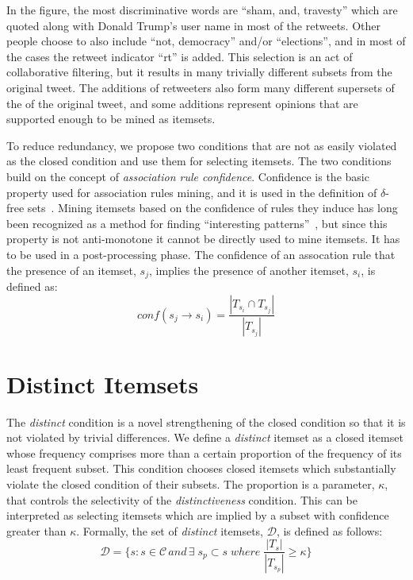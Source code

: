 \documentclass[letterpaper,12pt,titlepage,oneside,final]{book}
\begin{document}
In the figure, the most discriminative words are ``sham, and, travesty''
which are quoted along with Donald Trump's user name in most of the retweets.
Other people choose to also include ``not, democracy'' and/or ``elections'',
and in most of the cases the retweet indicator ``rt'' is added. 
This selection is an act of collaborative filtering,
but it results in many trivially different subsets from the original tweet.
The additions of retweeters also form many different supersets of the of the
original tweet, and some additions represent opinions that are supported
enough to be mined as itemsets. 

To reduce redundancy, we propose two conditions that are not as easily violated 
as the closed condition and use them for selecting itemsets.
The two conditions build on the concept of \emph{association rule confidence}.
Confidence is the basic property used for association rules mining,
and it is used in the definition of $\delta$-free sets~\cite{boulicaut2003free}.
Mining itemsets based on the confidence of rules they induce has long been
recognized as a method for finding
``interesting patterns''~\cite{cohen2001finding},
but since this property is not anti-monotone it cannot be directly used
to mine itemsets. It has to be used in a post-processing phase.
The confidence of an assocation rule that the presence of an itemset,
$s_{j}$, implies the presence of another itemset, $s_i$, is  defined as:
\begin{equation}\label{eq:conf}conf(s_j \rightarrow s_i) = \frac{|T_{s_i} \cap T_{s_j}|}{|T_{s_j}|}\end{equation}


\section{Distinct Itemsets}


The \emph{distinct} condition is a novel strengthening of the closed condition
so that it is not violated by trivial differences.
We define a \emph{distinct} itemset as a closed itemset whose frequency
comprises more than a certain proportion of the frequency of its least
frequent subset. 
This condition chooses closed itemsets which substantially violate the closed
condition of their subsets.
The proportion is a parameter, $\kappa$, that controls the selectivity of the
\emph{distinctiveness} condition.
This can be interpreted as selecting itemsets which are implied by a subset
with confidence greater than $\kappa$.
Formally, the set of \emph{distinct} itemsets, $\mathcal{D}$,
is defined as follows:
\begin{equation}\mathcal{D} = \{s: s \in \mathcal{C} \, and \, \exists \; s_{p} \subset s \; where \; \frac{|T_{s}|}{|T_{s_{p}}|} \ge \kappa 
\}\end{equation}
\end{document}
